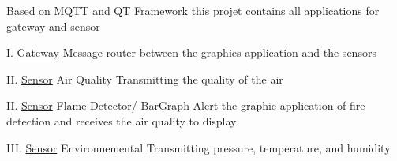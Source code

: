 Based on M\+Q\+TT and QT Framework this projet contains all applications for gateway and sensor

I. \hyperlink{classGateway}{Gateway} Message router between the graphics application and the sensors

II. \hyperlink{classSensor}{Sensor} Air Quality Transmitting the quality of the air

II. \hyperlink{classSensor}{Sensor} Flame Detector/ Bar\+Graph Alert the graphic application of fire detection and receives the air quality to display

I\+II. \hyperlink{classSensor}{Sensor} Environnemental Transmitting pressure, temperature, and humidity 
